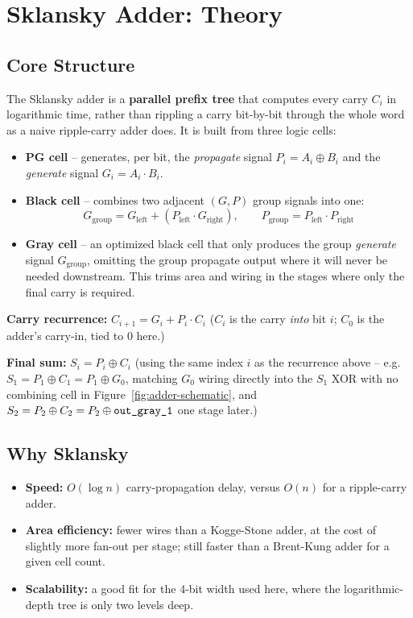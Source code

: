 \documentclass[11pt, a4paper]{article}
\newcommand{\sig}[1]{\texttt{#1}}
\begin{document}
\section{Sklansky Adder: Theory}

\subsection{Core Structure}
The Sklansky adder is a \textbf{parallel prefix tree} that computes every
carry $C_i$ in logarithmic time, rather than rippling a carry bit-by-bit
through the whole word as a naive ripple-carry adder does. It is built from
three logic cells:

\begin{itemize}
  \item \textbf{PG cell} -- generates, per bit, the \emph{propagate} signal
        $P_i = A_i \oplus B_i$ and the \emph{generate} signal $G_i = A_i \cdot B_i$.
  \item \textbf{Black cell} -- combines two adjacent $(G,P)$ group signals into one:
        \[
          G_{\mathrm{group}} = G_{\mathrm{left}} + \left(P_{\mathrm{left}} \cdot G_{\mathrm{right}}\right),
          \qquad
          P_{\mathrm{group}} = P_{\mathrm{left}} \cdot P_{\mathrm{right}}
        \]
  \item \textbf{Gray cell} -- an optimized black cell that only produces the
        group \emph{generate} signal $G_{\mathrm{group}}$, omitting the group
        propagate output where it will never be needed downstream. This
        trims area and wiring in the stages where only the final carry is required.
\end{itemize}

\noindent\textbf{Carry recurrence:} \(\displaystyle C_{i+1} = G_i + P_i \cdot C_i\)
\quad ($C_i$ is the carry \emph{into} bit $i$; $C_0$ is the adder's carry-in, tied to 0 here.)

\noindent\textbf{Final sum:} \(\displaystyle S_i = P_i \oplus C_i\)
\quad (using the same index $i$ as the recurrence above -- e.g.\ $S_1 = P_1 \oplus C_1 = P_1 \oplus G_0$, matching $G_0$ wiring directly into the $S_1$ XOR with no combining cell in Figure~\ref{fig:adder-schematic}, and $S_2 = P_2 \oplus C_2 = P_2 \oplus \text{\sig{out\_gray\_1}}$ one stage later.)

\subsection{Why Sklansky}
\begin{itemize}
  \item \textbf{Speed:} $O(\log n)$ carry-propagation delay, versus $O(n)$ for a ripple-carry adder.
  \item \textbf{Area efficiency:} fewer wires than a Kogge-Stone adder, at the cost of slightly more fan-out per stage; still faster than a Brent-Kung adder for a given cell count.
  \item \textbf{Scalability:} a good fit for the 4-bit width used here, where the logarithmic-depth tree is only two levels deep.
\end{itemize}
\end{document}
